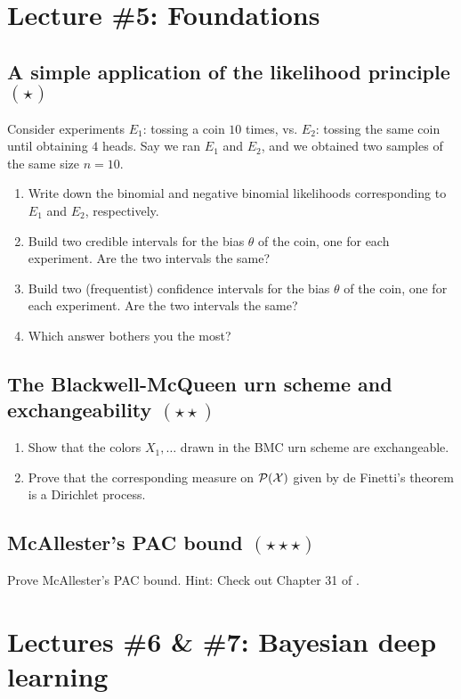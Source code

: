 \documentclass{article}
\begin{document}
\section{Lecture \#5: Foundations}

\subsection{A simple application of the likelihood principle $(\star)$}
Consider experiments $E_1$: tossing a coin $10$ times, vs. $E_2$: tossing the same coin until obtaining $4$ heads. Say we ran $E_1$ and $E_2$, and we obtained two samples of the same size $n=10$.
\begin{enumerate}
\item Write down the binomial and negative binomial likelihoods corresponding to $E_1$ and $E_2$, respectively.
\item Build two credible intervals for the bias $\theta$ of the coin, one for each experiment. Are the two intervals the same?
\item Build two (frequentist) confidence intervals for the bias $\theta$ of the coin, one for each experiment. Are the two intervals the same?
\item Which answer bothers you the most?
\end{enumerate}

\subsection{The Blackwell-McQueen urn scheme and exchangeability $(\star\star)$}
\begin{enumerate}
\item Show that the colors $X_1,\dots$ drawn in the BMC urn scheme are exchangeable.
\item Prove that the corresponding measure on $\mathcal P(\mathcal{X})$ given by de Finetti's theorem is a Dirichlet process.
\end{enumerate}

\subsection{McAllester's PAC bound $(\star\star\star)$}
Prove McAllester's PAC bound. Hint: Check out Chapter 31 of \citep{ShBe14}.

\section{Lectures \#6 \& \#7: Bayesian deep learning}
\end{document}
